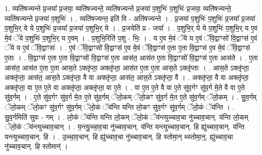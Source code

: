 \documentclass[17pt]{extarticle}
\begin{document}
1. व्यति॑षज्यन्ते प्र॒जया᳚ प्र॒जया॒ व्यति॑षज्यन्ते॒ व्यति॑षज्यन्ते प्र॒जया॑ प॒शुभिः॑ प॒शुभिः॑ प्र॒जया॒ व्यति॑षज्यन्ते॒ व्यति॑षज्यन्ते प्र॒जया॑ प॒शुभिः॑ । . व्यति॑षज्यन्त॒ इति॑ वि - अति॑षज्यन्ते । . प्र॒जया॑ प॒शुभिः॑ प॒शुभिः॑ प्र॒जया᳚ प्र॒जया॑ प॒शुभि॒र् ये ये प॒शुभिः॑ प्र॒जया᳚ प्र॒जया॑ प॒शुभि॒र् ये । . प्र॒जयेति॑ प्र - जया᳚ । . प॒शुभि॒र् ये ये प॒शुभिः॑ प॒शुभि॒र् य ए॒व मे॒वं ॅये प॒शुभिः॑ प॒शुभि॒र् य ए॒वम् । . प॒शुभि॒रिति॑ प॒शु - भिः॒ । . य ए॒व मे॒वं ॅये य ए॒वं ॅवि॒द्वाꣳसो॑ वि॒द्वाꣳस॑ ए॒वं ॅये य ए॒वं ॅवि॒द्वाꣳसः॑ । . ए॒वं ॅवि॒द्वाꣳसो॑ वि॒द्वाꣳस॑ ए॒व मे॒वं ॅवि॒द्वाꣳस॑ ए॒ता ए॒ता वि॒द्वाꣳस॑ ए॒व मे॒वं ॅवि॒द्वाꣳस॑ ए॒ताः । . वि॒द्वाꣳस॑ ए॒ता ए॒ता वि॒द्वाꣳसो॑ वि॒द्वाꣳस॑ ए॒ता आस॑त॒ आस॑त ए॒ता वि॒द्वाꣳसो॑ वि॒द्वाꣳस॑ ए॒ता आस॑ते । . ए॒ता आस॑त॒ आस॑त ए॒ता ए॒ता आस॒ते ऽक्लृ॑प्ता॒ अक्लृ॑प्ता॒ आस॑त ए॒ता ए॒ता आस॒ते ऽक्लृ॑प्ताः । . आस॒ते ऽक्लृ॑प्ता॒ अक्लृ॑प्ता॒ आस॑त॒ आस॒ते ऽक्लृ॑प्ता॒ वै वा अक्लृ॑प्ता॒ आस॑त॒ आस॒ते ऽक्लृ॑प्ता॒ वै । . अक्लृ॑प्ता॒ वै वा अक्लृ॑प्ता॒ अक्लृ॑प्ता॒ वा ए॒त ए॒ते वा अक्लृ॑प्ता॒ अक्लृ॑प्ता॒ वा ए॒ते । . वा ए॒त ए॒ते वै वा ए॒ते सु॑व॒र्गꣳ सु॑व॒र्ग मे॒ते वै वा ए॒ते सु॑व॒र्गम् । . ए॒ते सु॑व॒र्गꣳ सु॑व॒र्ग मे॒त ए॒ते सु॑व॒र्गम् ॅलो॒कम् ॅलो॒कꣳ सु॑व॒र्ग मे॒त ए॒ते सु॑व॒र्गम् ॅलो॒कम् । . सु॒व॒र्गम् ॅलो॒कम् ॅलो॒कꣳ सु॑व॒र्गꣳ सु॑व॒र्गम् ॅलो॒कं ॅय॑न्ति यन्ति लो॒कꣳ सु॑व॒र्गꣳ सु॑व॒र्गम् ॅलो॒कं ॅय॑न्ति । . सु॒व॒र्गमिति॑ सुवः - गम् । . लो॒कं ॅय॑न्ति यन्ति लो॒कम् ॅलो॒कं ॅय॑न्त्युच्चाव॒चा नु॑च्चाव॒चान्. य॑न्ति लो॒कम् ॅलो॒कं ॅय॑न्त्युच्चाव॒चान् । . य॒न्त्यु॒च्चा॒व॒चा नु॑च्चाव॒चान्. य॑न्ति यन्त्युच्चाव॒चान्. हि ह्यु॑च्चाव॒चान्. य॑न्ति यन्त्युच्चाव॒चान्. हि । . उ॒च्चा॒व॒चान्. हि ह्यु॑च्चाव॒चा नु॑च्चाव॒चान्. हि स्तोमा॒न् थ्स्तोमा॒न्॒. ह्यु॑च्चाव॒चा नु॑च्चाव॒चान्. हि स्तोमान्॑ । \newline
\end{document}
